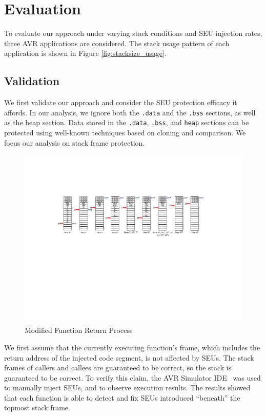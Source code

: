 \vspace{-20pt}
\section{Evaluation}\label{sec:evaluation}
\vspace{-15pt}

To evaluate our approach under varying stack conditions and SEU injection rates, three AVR applications are considered. The stack usage pattern of each application is shown in Figure \ref{fig:stacksize_usage}.
\vspace{-15pt}
\subsection{Validation}
\vspace{-20pt}
We first validate our approach and consider the SEU protection efficacy it affords. In our analysis, we ignore both the \texttt{.data} and the \texttt{.bss} sections, as well as the heap section. Data stored in the \texttt{.data}, \texttt{.bss}, and \texttt{heap} sections can be protected using well-known techniques based on cloning and comparison. We focus our analysis on stack frame protection.
\vspace{-20pt}
\begin{figure}
	\centering
	\includegraphics[width=1.0\textwidth]{figures/modified_function_operations_stack_post_execution_v3}
	\vspace{-20pt}
	\caption{Modified Function Return Process}\label{fig:modified_function_operation_post_execution}
\end{figure}
\vspace{-25pt}
We first assume that the currently executing function's frame, which includes the return address of the injected code segment, is not affected by SEUs. The stack frames of callers and callees are guaranteed to be correct, so the stack is guaranteed to be correct. To verify this claim, the AVR Simulator IDE~\cite{avrsimide} was used to manually inject SEUs, and to observe execution results. The results showed that each function is able to detect and fix SEUs introduced ``beneath'' the topmost stack frame.

